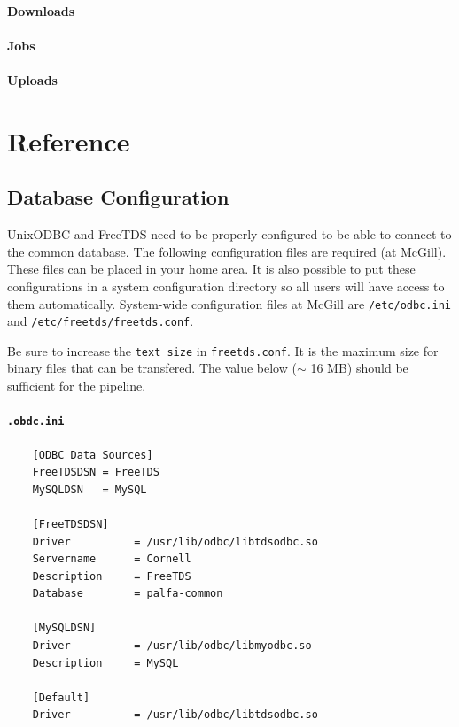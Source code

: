 \documentclass[12pt]{article}
\begin{document}
\paragraph{Downloads}

\paragraph{Jobs}

\paragraph{Uploads}


\section{Reference}
\subsection{Database Configuration}
\label{sec:dbconf}
UnixODBC and FreeTDS need to be properly configured to be able to connect to the common database. The following configuration files are required (at McGill). These files can be placed in your home area. It is also possible to put these configurations in a system configuration directory so all users will have access to them automatically. System-wide configuration files at McGill are \texttt{/etc/odbc.ini} and \texttt{/etc/freetds/freetds.conf}.

Be sure to increase the \texttt{text size} in \texttt{freetds.conf}. It is the maximum size for binary files that can be transfered. The value below ($\sim$ 16 MB) should be sufficient for the pipeline.

\paragraph{\texttt{.obdc.ini}}
\begin{verbatim}
    [ODBC Data Sources]
    FreeTDSDSN = FreeTDS
    MySQLDSN   = MySQL

    [FreeTDSDSN]
    Driver          = /usr/lib/odbc/libtdsodbc.so
    Servername      = Cornell
    Description     = FreeTDS
    Database        = palfa-common

    [MySQLDSN]
    Driver          = /usr/lib/odbc/libmyodbc.so
    Description     = MySQL

    [Default]
    Driver          = /usr/lib/odbc/libtdsodbc.so
\end{verbatim}
\end{document}
